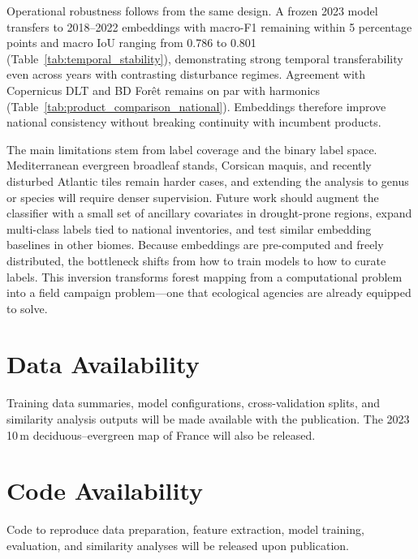 \documentclass[utf8]{FrontiersinHarvard}
\begin{document}
Operational robustness follows from the same design. A frozen 2023 model transfers to 2018–2022 embeddings with macro-F1 remaining within 5 percentage points and macro IoU ranging from 0.786 to 0.801 (Table~\ref{tab:temporal_stability}), demonstrating strong temporal transferability even across years with contrasting disturbance regimes. Agreement with Copernicus DLT and BD Forêt remains on par with harmonics (Table~\ref{tab:product_comparison_national}). Embeddings therefore improve national consistency without breaking continuity with incumbent products.

The main limitations stem from label coverage and the binary label space. Mediterranean evergreen broadleaf stands, Corsican maquis, and recently disturbed Atlantic tiles remain harder cases, and extending the analysis to genus or species will require denser supervision. Future work should augment the classifier with a small set of ancillary covariates in drought-prone regions, expand multi-class labels tied to national inventories, and test similar embedding baselines in other biomes. Because embeddings are pre-computed and freely distributed, the bottleneck shifts from how to train models to how to curate labels. This inversion transforms forest mapping from a computational problem into a field campaign problem—one that ecological agencies are already equipped to solve.

\section*{Data Availability}
Training data summaries, model configurations, cross-validation splits, and similarity analysis outputs will be made available with the publication. The 2023 10\,m deciduous–evergreen map of France will also be released.

\section*{Code Availability}
Code to reproduce data preparation, feature extraction, model training, evaluation, and similarity analyses will be released upon publication.



\end{document}
